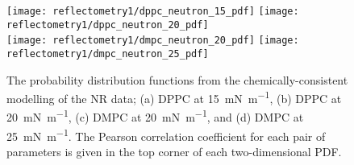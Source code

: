 %
%
\begin{figure}
\forceversofloat
    \centering
    \texttt{[image: reflectometry1/dppc\_neutron\_15\_pdf]}
    \texttt{[image: reflectometry1/dppc\_neutron\_20\_pdf]} \\
    \texttt{[image: reflectometry1/dmpc\_neutron\_20\_pdf]}
    \texttt{[image: reflectometry1/dmpc\_neutron\_25\_pdf]}
    \caption{The probability distribution functions from the chemically-consistent modelling of the NR data; (a) DPPC at \SI{15}{\milli\newton\per\meter}, (b) DPPC at \SI{20}{\milli\newton\per\meter}, (c) DMPC at \SI{20}{\milli\newton\per\meter}, and (d) DMPC at \SI{25}{\milli\newton\per\meter}. The Pearson correlation coefficient for each pair of parameters is given in the top corner of each two-dimensional PDF.}
    \label{fig:nrpdfs}
\end{figure}
